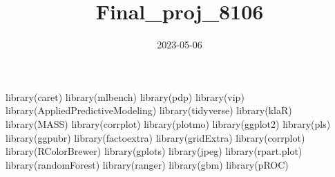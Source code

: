 \documentclass[
]{article}
\title{Final\_proj\_8106}
\author{}
\date{\vspace{-2.5em}2023-05-06}
\newenvironment{Shaded}{\begin{snugshade}}{\end{snugshade}}
\newcommand{\FunctionTok}[1]{\textcolor[rgb]{0.00,0.00,0.00}{#1}}
\newcommand{\NormalTok}[1]{#1}
\begin{document}
\maketitle

\newpage
\newpage

\begin{Shaded}
\begin{Highlighting}[]
\FunctionTok{library}\NormalTok{(caret)}
\FunctionTok{library}\NormalTok{(mlbench)}
\FunctionTok{library}\NormalTok{(pdp)}
\FunctionTok{library}\NormalTok{(vip)}
\FunctionTok{library}\NormalTok{(AppliedPredictiveModeling)}
\FunctionTok{library}\NormalTok{(tidyverse)}
\FunctionTok{library}\NormalTok{(klaR)}
\FunctionTok{library}\NormalTok{(MASS)}
\FunctionTok{library}\NormalTok{(corrplot)}
\FunctionTok{library}\NormalTok{(plotmo)}
\FunctionTok{library}\NormalTok{(ggplot2)}
\FunctionTok{library}\NormalTok{(pls)}
\FunctionTok{library}\NormalTok{(ggpubr)}
\FunctionTok{library}\NormalTok{(factoextra)}
\FunctionTok{library}\NormalTok{(gridExtra)}
\FunctionTok{library}\NormalTok{(corrplot)}
\FunctionTok{library}\NormalTok{(RColorBrewer) }
\FunctionTok{library}\NormalTok{(gplots)}
\FunctionTok{library}\NormalTok{(jpeg)}
\FunctionTok{library}\NormalTok{(rpart.plot)}
\FunctionTok{library}\NormalTok{(randomForest)}
\FunctionTok{library}\NormalTok{(ranger)}
\FunctionTok{library}\NormalTok{(gbm)}
\FunctionTok{library}\NormalTok{(pROC)}
\end{Highlighting}
\end{Shaded}
\end{document}
